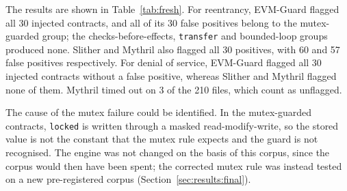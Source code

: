 \documentclass[pdflatex,sn-mathphys]{sn-jnl}
\theoremstyle{thmstyletwo}
\theoremstyle{thmstyletwo}
\begin{document}
The results are shown in Table~\ref{tab:fresh}. For reentrancy, EVM-Guard flagged all 30 injected contracts, and all of its 30 false positives belong to the mutex-guarded group; the checks-before-effects, \texttt{transfer} and bounded-loop groups produced none. Slither and Mythril also flagged all 30 positives, with 60 and 57 false positives respectively. For denial of service, EVM-Guard flagged all 30 injected contracts without a false positive, whereas Slither and Mythril flagged none of them. Mythril timed out on 3 of the 210 files, which count as unflagged.

\begin{table}[t]
\centering
\small
\caption{First pre-registered synthetic test (210 Solidity 0.5.12 contracts, engine v3). Recall, precision and FPR with exact 95\% Clopper--Pearson intervals. Each category is scored on its own positives and negatives.}
\label{tab:fresh}
\end{table}

The cause of the mutex failure could be identified. In the mutex-guarded contracts, \texttt{locked} is written through a masked read-modify-write, so the stored value is not the constant that the mutex rule expects and the guard is not recognised. The engine was not changed on the basis of this corpus, since the corpus would then have been spent; the corrected mutex rule was instead tested on a new pre-registered corpus (Section~\ref{sec:results:final}).
\end{document}
